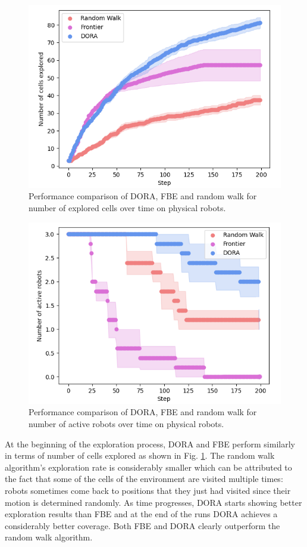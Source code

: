 \documentclass[letterpaper, 10 pt, conference]{ieeeconf}
\begin{document}
\begin{figure}[h]
    \centering
    \includegraphics[width=0.95\columnwidth]{images/explored_real.png}
    \caption{Performance comparison of DORA, FBE and random walk for number of explored cells over time on physical robots.}
    \label{results:cells_explored_physical}
\end{figure}

\begin{figure}[h]
    \centering
    \includegraphics[width=0.95\columnwidth]{images/activerobots_real.png}
    \caption{Performance comparison of DORA, FBE and random walk for number of active robots over time on physical robots.}
    \label{results:active_robots_physical}
\end{figure}

At the beginning of the exploration process, DORA and FBE perform
similarly in terms of number of cells explored as shown in
Fig. \ref{results:cells_explored_physical}. The random walk
algorithm's exploration rate is considerably smaller which can be
attributed to the fact that some of the cells of the environment are
visited multiple times: robots sometimes come back to positions that
they just had visited since their motion is determined randomly. As
time progresses, DORA starts showing better exploration results than
FBE and at the end of the runs DORA achieves a considerably better
coverage. Both FBE and DORA clearly outperform the random walk
algorithm.
\end{document}
